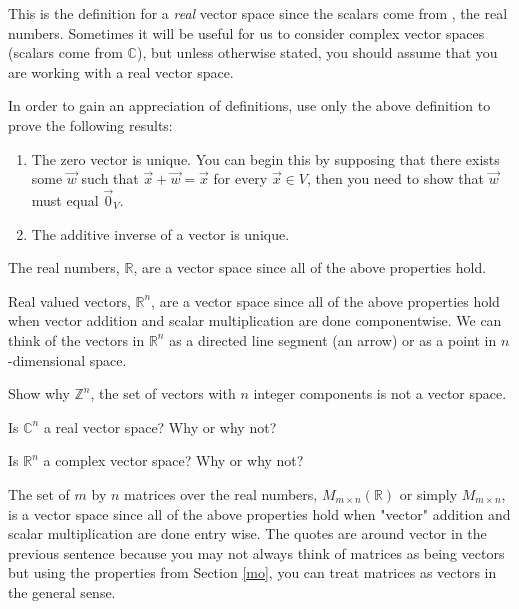 This is the definition for a \emph{real} vector space since the scalars come from \R, the real numbers. Sometimes it will be useful for us to consider complex vector spaces (scalars come from $\mathbb{C}$), but unless otherwise stated, you should assume that you are working with a real vector space.

\bq
In order to gain an appreciation of definitions, use only the above definition to prove the following results:
\begin{enumerate}
\item The zero vector is unique. You can begin this by supposing that there exists some $\vec{w}$ such that $\vec{x} +\vec{w} = \vec{x}$ for every $\vec{x} \in V$, then you need to show that $\vec{w}$ must equal $\vec{0}_V$.
\item The additive inverse of a vector is unique.
\end{enumerate}
\eq

\begin{example}
The real numbers, $\mathbb{R}$, are a vector space since all of the above properties hold.
\end{example}
\begin{example}
Real valued vectors, $\mathbb{R}^n$, are a vector space since all of the above properties hold when vector addition and scalar multiplication are done componentwise. We can think of the vectors in $\mathbb{R}^n$ as a directed line segment (an arrow) or as a point in $n$-dimensional space.
\end{example}

\bq Show why $\mathbb{Z}^n$, the set of vectors with $n$ integer components is not a vector space.
\eq

\bq Is $\mathbb{C}^n$ a real vector space? Why or why not?
\eq

\bq Is $\mathbb{R}^n$ a complex vector space? Why or why not?
\eq

\begin{example}
The set of $m$ by $n$ matrices over the real numbers, $M_{m \times n}(\mathbb{R})$ or simply $M_{m \times n}$, is a vector space since all of the above properties hold when "vector" addition and scalar multiplication are done entry wise. The quotes are around vector in the previous sentence because you may not always think of matrices as being vectors but using the properties from Section \ref{mo}, you can treat matrices as vectors in the general sense.
\end{example}


